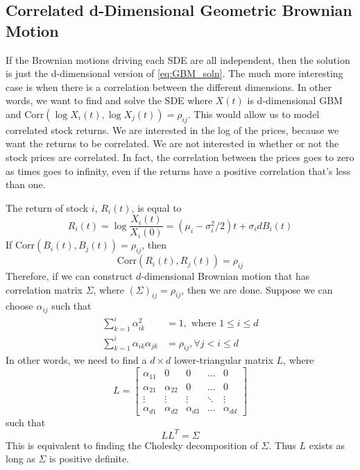 \documentclass{amsart}
\theoremstyle{definition}
\theoremstyle{remark}
\begin{document}
\subsection{Correlated d-Dimensional Geometric Brownian Motion}\label{corr_gmb}
If the Brownian motions driving each SDE are all independent, then the solution is just the d-dimensional version of \eqref{eq:GBM_soln}. The much more interesting case is when there is a correlation between the different dimensions. In other words, we want to find and solve the SDE where $X(t)$ is d-dimensional GBM and $\text{Corr}(\log X_i(t), \log X_j(t)) = \rho_{ij}$. This would allow us to model correlated stock returns. We are interested in the log of the prices, because we want the returns to be correlated. We are not interested in whether or not the stock prices are correlated. In fact, the correlation between the prices goes to zero as times goes to infinity, even if the returns have a positive correlation that's less than one.

The return of stock $i$, $R_i(t)$, is equal to
\begin{equation*}
R_i(t) = \log \frac{X_i(t)}{X_i(0)} = (\mu_i-\sigma_i^2/2)t +\sigma_i dB_i(t)
\end{equation*}
If Corr$(B_i(t),B_j(t)) = \rho_{ij}$, then
\begin{equation*}
\text{Corr}(R_i(t),R_j(t)) = \rho_{ij}
\end{equation*}
Therefore, if we can construct $d$-dimensional Brownian motion that has correlation matrix $\Sigma$, where $(\Sigma)_{ij} = \rho_{ij}$, then we are done. Suppose we can choose $\alpha_{ij}$ such that
\begin{align*}
\sum_{k=1}^i \alpha_{ik}^2 &= 1, \text{ where } 1\le i\le d\\
\sum_{k=1}^i \alpha_{ik}\alpha_{jk}&= \rho_{ij}, \forall j < i \le d
\end{align*}
In other words, we need to find a $d\times d$ lower-triangular matrix $L$, where
\begin{equation*}
L= \begin{bmatrix}
    \alpha_{11} & 0 & 0 & \dots  & 0 \\
    \alpha_{21} & \alpha_{22} & 0 & \dots  & 0 \\
    \vdots & \vdots & \vdots & \ddots & \vdots \\
    \alpha_{d1} & \alpha_{d2} & \alpha_{d3}& \dots  & \alpha_{dd}
\end{bmatrix}
\end{equation*}
such that
\begin{equation*}
L L^T = \Sigma
\end{equation*}
This is equivalent to finding the Cholesky decomposition of $\Sigma$. Thus $L$ exists as long as $\Sigma$ is positive definite.
\end{document}
